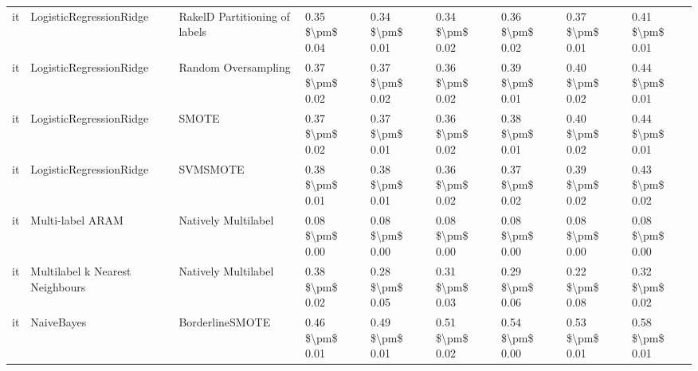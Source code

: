 \begin{tabular}{lllllllll}
      it &         LogisticRegressionRidge & RakelD Partitioning of labels & 0.35 \$\textbackslash pm\$ 0.04 &           0.34 \$\textbackslash pm\$ 0.01 &       0.34 \$\textbackslash pm\$ 0.02 &        0.36 \$\textbackslash pm\$ 0.02 &                         0.37 \$\textbackslash pm\$ 0.01 &     0.41 \$\textbackslash pm\$ 0.01 \\
      it &         LogisticRegressionRidge &           Random Oversampling & 0.37 \$\textbackslash pm\$ 0.02 &           0.37 \$\textbackslash pm\$ 0.02 &       0.36 \$\textbackslash pm\$ 0.02 &        0.39 \$\textbackslash pm\$ 0.01 &                         0.40 \$\textbackslash pm\$ 0.02 &     0.44 \$\textbackslash pm\$ 0.01 \\
      it &         LogisticRegressionRidge &                         SMOTE & 0.37 \$\textbackslash pm\$ 0.02 &           0.37 \$\textbackslash pm\$ 0.01 &       0.36 \$\textbackslash pm\$ 0.02 &        0.38 \$\textbackslash pm\$ 0.01 &                         0.40 \$\textbackslash pm\$ 0.02 &     0.44 \$\textbackslash pm\$ 0.01 \\
      it &         LogisticRegressionRidge &                      SVMSMOTE & 0.38 \$\textbackslash pm\$ 0.01 &           0.38 \$\textbackslash pm\$ 0.01 &       0.36 \$\textbackslash pm\$ 0.02 &        0.37 \$\textbackslash pm\$ 0.02 &                         0.39 \$\textbackslash pm\$ 0.02 &     0.43 \$\textbackslash pm\$ 0.02 \\
      it &                Multi-label ARAM &           Natively Multilabel & 0.08 \$\textbackslash pm\$ 0.00 &           0.08 \$\textbackslash pm\$ 0.00 &       0.08 \$\textbackslash pm\$ 0.00 &        0.08 \$\textbackslash pm\$ 0.00 &                         0.08 \$\textbackslash pm\$ 0.00 &     0.08 \$\textbackslash pm\$ 0.00 \\
      it & Multilabel k Nearest Neighbours &           Natively Multilabel & 0.38 \$\textbackslash pm\$ 0.02 &           0.28 \$\textbackslash pm\$ 0.05 &       0.31 \$\textbackslash pm\$ 0.03 &        0.29 \$\textbackslash pm\$ 0.06 &                         0.22 \$\textbackslash pm\$ 0.08 &     0.32 \$\textbackslash pm\$ 0.02 \\
      it &                      NaiveBayes &               BorderlineSMOTE & 0.46 \$\textbackslash pm\$ 0.01 &           0.49 \$\textbackslash pm\$ 0.01 &       0.51 \$\textbackslash pm\$ 0.02 &        0.54 \$\textbackslash pm\$ 0.00 &                         0.53 \$\textbackslash pm\$ 0.01 &     0.58 \$\textbackslash pm\$ 0.01 \\

\end{tabular}
